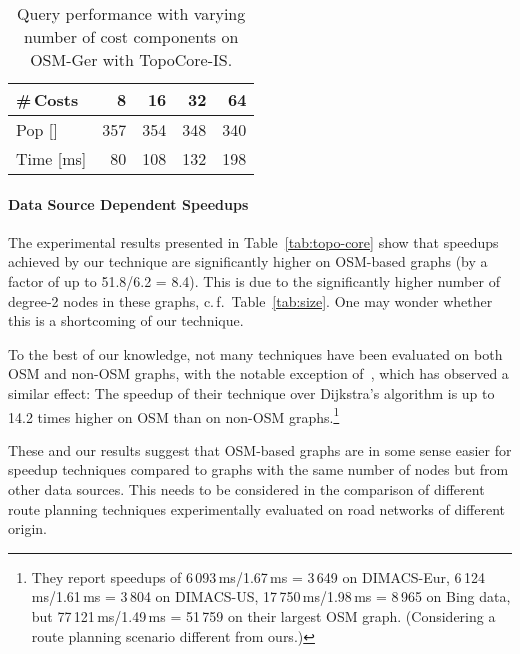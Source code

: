 \documentclass{sig-alternate}
\newcommand{\cf}{c.\,f.\xspace}
\begin{document}
\begin{table}
\begin{center}
{	}
	\end{center}
\caption{\label{tab:cost-comp}Query performance with varying number of cost components on OSM-Ger with TopoCore-IS.}
\begin{centering}
\begin{tabular}{lrrrr}
\toprule
\#\,Costs &  8 & 16 & 32 & 64 \\
\midrule
Pop {[}{]} & 357 &  354 &348 & 340\\
Time [ms] & 80 & 108 & 132& 198 \\
\bottomrule
\end{tabular}
\par\end{centering}
\end{table}







\paragraph{Data Source Dependent Speedups}

The experimental results presented in Table~\ref{tab:topo-core} show that speedups achieved by our technique are significantly higher on OSM-based graphs (by a factor of up to 51.8/6.2 = 8.4). 
This is due to the significantly higher number of degree-2 nodes in these graphs, \cf~Table~\ref{tab:size}.
One may wonder whether this is a shortcoming of our technique. 

To the best of our knowledge, not many techniques have been evaluated on both OSM and non-OSM graphs, with the notable exception of~\cite{dgpw-crprn-13}, which has observed a similar effect: The speedup of their technique over Dijkstra's algorithm is up to 14.2 times higher on OSM than on non-OSM graphs.\footnote{They report speedups of 6\,093\,ms/1.67\,ms = 3\,649 on DIMACS-Eur, 6\,124\,ms/1.61\,ms = 3\,804 on DIMACS-US, 17\,750\,ms/1.98\,ms = 8\,965 on Bing data, but 77\,121\,ms/1.49\,ms = 51\,759 on their largest OSM graph. (Considering a route planning scenario different from ours.)}





These and our results suggest that OSM-based graphs are in some sense easier for speedup techniques compared to graphs with the same number of nodes but from other data sources. This needs to be considered in the comparison of different route planning techniques experimentally evaluated on road networks of different origin.
\end{document}
